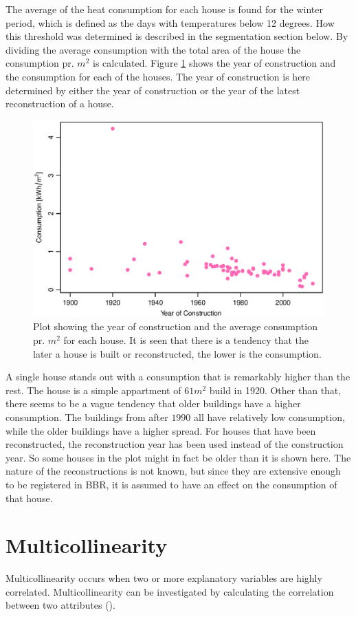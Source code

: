 \noindent The average of the heat consumption for each house is found for the winter period, which is defined as the days with temperatures below 12 degrees. How this threshold was determined is described in the segmentation section below. By dividing the average consumption with the total area of the house the consumption pr. $m^2$ is calculated. Figure \ref{fig: byggeaar} shows the year of construction and the consumption for each of the houses. The year of construction is here determined by either the year of construction or the year of the latest reconstruction of a house. 
\begin{figure}[H]
    \centering
    \includegraphics[width=.8\textwidth]{../../../figures/byggeaar.eps}
    \caption{Plot showing the year of construction and the average consumption pr. $m^2$ for each house. It is seen that there is a tendency that the later a house is built or reconstructed, the lower is the consumption.}
    \label{fig: byggeaar}
\end{figure}
\noindent A single house stands out with a consumption that is remarkably higher than the rest. The house is a simple appartment of $61 m^2$ build in 1920. Other than that, there seems to be a vague tendency that older buildings have a higher consumption. The buildings from after $1990$ all have relatively low consumption, while the older buildings have a higher spread. For houses that have been reconstructed, the reconstruction year has been used instead of the construction year. So some houses in the plot might in fact be older than it is shown here. The nature of the reconstructions is not known, but since they are extensive enough to be registered in BBR, it is assumed to have an effect on the consumption of that house.

\section{Multicollinearity}
Multicollinearity occurs when two or more explanatory variables are highly correlated. Multicollinearity can be investigated by calculating the correlation between two attributes (\cite{Multicollinearity}).\\

